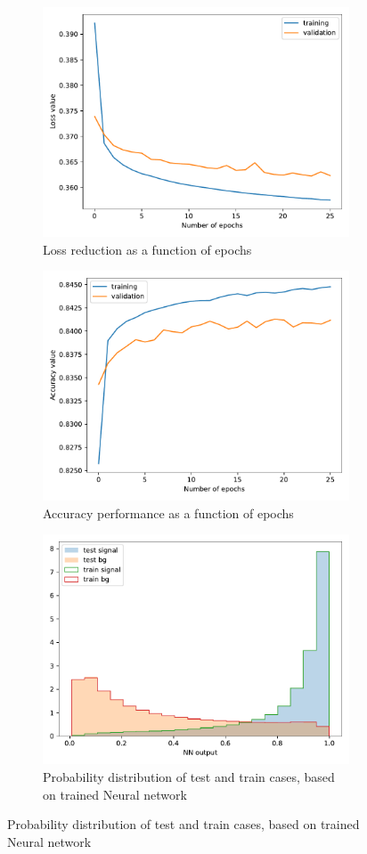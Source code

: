 \documentclass[]{article}
\begin{document}
\begin{figure}[ht]

	\begin{subfigure}{\textwidth}
		\centering
		\includegraphics[height=.45\linewidth]{base_model/base_loss.pdf}
		\caption{Loss reduction as a function of epochs}
	\end{subfigure}%
	\vspace{0.2cm} %
	
	\begin{subfigure}{\textwidth}
	\centering
		\includegraphics[height=.45\linewidth]{base_model/base_accuracy.pdf}
		\caption{Accuracy performance as a function of epochs}
	
	\end{subfigure}
	\vspace{0.2cm} %
	
	\begin{subfigure}{\textwidth}
		\centering
		\includegraphics[height=.45\linewidth]{base_model/base_NNout.pdf}
		\caption{Probability distribution of test and train cases, based on trained Neural network}
	\end{subfigure}
	

\end{figure}
\end{document}
